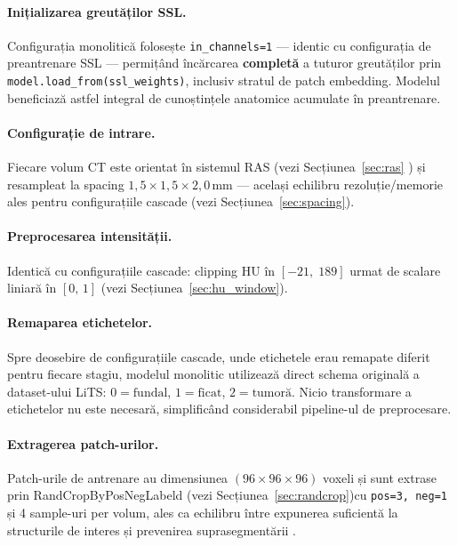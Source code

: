 \documentclass[12pt, a4paper]{report}
\begin{document}
\paragraph{Inițializarea greutăților SSL.}
Configurația monolitică folosește \texttt{in\_channels=1} --- identic
cu configurația de preantrenare SSL --- permițând încărcarea
\textbf{completă} a tuturor greutăților prin
\texttt{model.load\_from(ssl\_weights)}, inclusiv stratul de
patch embedding. Modelul beneficiază astfel integral de cunoștințele
anatomice acumulate în preantrenare.


\paragraph{Configurație de intrare.}
Fiecare volum CT este orientat în sistemul RAS (vezi Secțiunea~\ref{sec:ras} )  și resampleat la
spacing $1{,}5 \times 1{,}5 \times 2{,}0$\,mm — același echilibru
rezoluție/memorie ales pentru configurațiile cascade
(vezi Secțiunea~\ref{sec:spacing}).

\paragraph{Preprocesarea intensității.}
Identică cu configurațiile cascade: clipping HU în
$[-21,\;189]$ urmat de scalare liniară în $[0,\,1]$
(vezi Secțiunea~\ref{sec:hu_window}).

\paragraph{Remaparea etichetelor.}
Spre deosebire de configurațiile cascade, unde etichetele erau
remapate diferit pentru fiecare stagiu, modelul monolitic utilizează
direct schema originală a dataset-ului LiTS:
$0 = \text{fundal}$, $1 = \text{ficat}$, $2 = \text{tumoră}$.
Nicio transformare a etichetelor nu este necesară, simplificând
considerabil pipeline-ul de preprocesare.

\paragraph{Extragerea patch-urilor.}
Patch-urile de antrenare au dimensiunea $(96 \times 96 \times 96)$
voxeli și sunt extrase prin
RandCropByPosNegLabeld (vezi Secțiunea~\ref{sec:randcrop})cu
\texttt{pos=3, neg=1} și 4 sample-uri per volum, ales ca echilibru între
expunerea suficientă la structurile de interes și prevenirea
suprasegmentării
.
\end{document}
